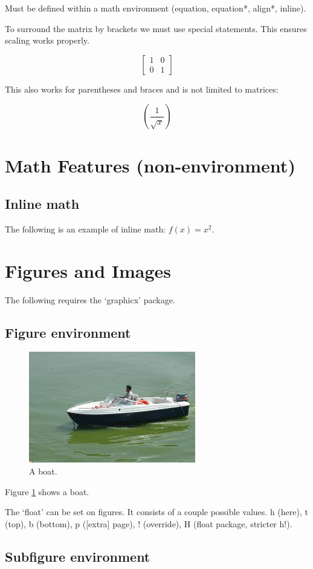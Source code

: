 \documentclass{article}
\begin{document}
Must be defined within a math environment (equation, equation*, align*, inline).

To surround the matrix by brackets we must use special statements. This ensures scaling works properly.

\begin{equation*}
	\left[
	\begin{matrix}
		1 & 0\\
		0 & 1
	\end{matrix}
	\right]
\end{equation*}

This also works for parentheses and braces and is not limited to matrices:

\begin{equation*}
	\left(\frac{1}{\sqrt{x}}\right)
\end{equation*}

\section{Math Features (non-environment)}

\subsection{Inline math}
The following is an example of inline math: $f(x) = x^2$.

\section{Figures and Images}

The following requires the `graphicx' package.

\subsection{Figure environment}

\begin{figure}[H]
	\includegraphics[width=\linewidth]{boat.jpg}
	\caption{A boat.}
	\label{fig:boat1}
\end{figure}

Figure \ref{fig:boat1} shows a boat.

The `float' can be set on figures. It consists of a couple possible values.
h (here), t (top), b (bottom), p ([extra] page), ! (override), H (float package, stricter h!).

\subsection{Subfigure environment}
\end{document}
